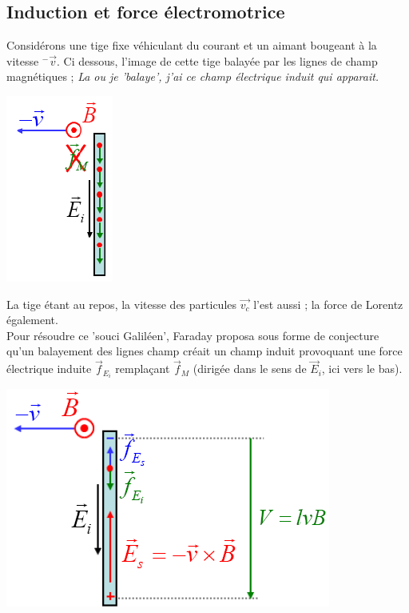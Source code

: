 \documentclass	[11pt, a4paper, openany]{book}
\begin{document}
\subsection{Induction et force électromotrice}
Considérons une tige fixe véhiculant du courant et un aimant bougeant à la vitesse $^-\vec{v}$. Ci dessous, l'image de cette tige balayée par les lignes de champ magnétiques ; \textit{La ou je 'balaye', j'ai ce champ électrique induit qui apparait.}
\begin{center}
	\includegraphics[scale=0.35]{em/image3.png}\\
\end{center}
La tige étant au repos, la vitesse des particules $\vec{v_c}$ l'est aussi ; la force de Lorentz également. \\

Pour résoudre ce 'souci Galiléen', Faraday proposa sous forme de conjecture qu'un balayement des lignes champ créait un champ induit provoquant une force électrique induite $\vec{f}_{E_i}$ remplaçant $\vec{f}_M$ (dirigée dans le sens de $\vec{E}_i$, ici vers le bas).
\begin{center}
	\includegraphics[scale=0.45]{em/image4.png}\\
\end{center}
\end{document}
